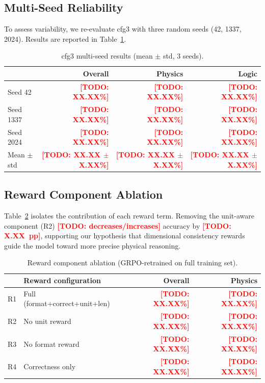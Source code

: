 \documentclass{ieeeaccess}
\newcommand{\todo}[1]{\textcolor{red}{\textbf{[TODO: #1]}}}
\begin{document}
\subsection{Multi-Seed Reliability}

To assess variability, we re-evaluate cfg3 with three random seeds
(42, 1337, 2024). Results are reported in Table~\ref{tab:multiseed}.

\begin{table}[t]
  \centering
  \caption{cfg3 multi-seed results (mean $\pm$ std, 3 seeds).}
  \label{tab:multiseed}
  \begin{tabular}{lrrr}
    \toprule
    & \textbf{Overall} & \textbf{Physics} & \textbf{Logic} \\
    \midrule
    Seed 42   & \todo{XX.XX\%} & \todo{XX.XX\%} & \todo{XX.XX\%} \\
    Seed 1337 & \todo{XX.XX\%} & \todo{XX.XX\%} & \todo{XX.XX\%} \\
    Seed 2024 & \todo{XX.XX\%} & \todo{XX.XX\%} & \todo{XX.XX\%} \\
    \midrule
    Mean $\pm$ std & \todo{XX.XX $\pm$ X.XX\%} & \todo{XX.XX $\pm$ X.XX\%} & \todo{XX.XX $\pm$ X.XX\%} \\
    \bottomrule
  \end{tabular}
\end{table}

\subsection{Reward Component Ablation}

Table~\ref{tab:reward_ablation} isolates the contribution of each reward term.
Removing the unit-aware component (R2) \todo{decreases/increases} accuracy by
\todo{X.XX~pp}, supporting our hypothesis that dimensional consistency rewards
guide the model toward more precise physical reasoning.

\begin{table}[t]
  \centering
  \caption{Reward component ablation (GRPO-retrained on full training set).}
  \label{tab:reward_ablation}
  \begin{tabular}{llrr}
    \toprule
    & \textbf{Reward configuration} & \textbf{Overall} & \textbf{Physics} \\
    \midrule
    R1 & Full (format+correct+unit+len) & \todo{XX.XX\%} & \todo{XX.XX\%} \\
    R2 & No unit reward               & \todo{XX.XX\%} & \todo{XX.XX\%} \\
    R3 & No format reward             & \todo{XX.XX\%} & \todo{XX.XX\%} \\
    R4 & Correctness only             & \todo{XX.XX\%} & \todo{XX.XX\%} \\
    \bottomrule
  \end{tabular}
\end{table}
\end{document}
